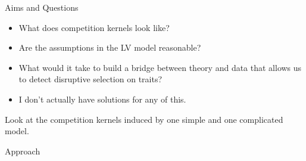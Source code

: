 \documentclass[12pt]{beamer}
\begin{document}
\begin{frame}{Aims and Questions}

  \begin{itemize}
  \item What does competition kernels look like?
  \item Are the assumptions in the LV model reasonable?
  \item What would it take to build a bridge between theory and data
    that allows us to detect disruptive selection on traits?
  \item I don't actually have solutions for any of this.
  \end{itemize}

  Look at the competition kernels induced by one simple and one
  complicated model.
\end{frame}


\begin{frame}{Approach}





\end{frame}
\end{document}
